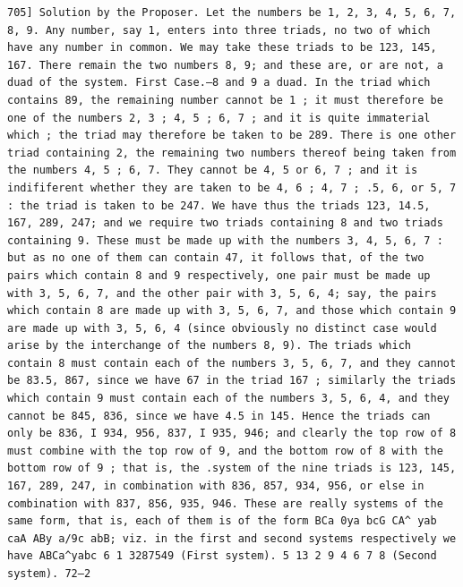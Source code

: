 \documentclass[12pt]{article}
\theoremstyle{plain}
\begin{document}
\newpage
\setcounter{page}{571}
\begin{verbatim}
705] Solution by the Proposer. Let the numbers be 1, 2, 3, 4, 5, 6, 7, 8, 9. Any number, say 1, enters into three triads, no two of which have any number in common. We may take these triads to be 123, 145, 167. There remain the two numbers 8, 9; and these are, or are not, a duad of the system. First Case.—8 and 9 a duad. In the triad which contains 89, the remaining number cannot be 1 ; it must therefore be one of the numbers 2, 3 ; 4, 5 ; 6, 7 ; and it is quite immaterial which ; the triad may therefore be taken to be 289. There is one other triad containing 2, the remaining two numbers thereof being taken from the numbers 4, 5 ; 6, 7. They cannot be 4, 5 or 6, 7 ; and it is indififerent whether they are taken to be 4, 6 ; 4, 7 ; .5, 6, or 5, 7 : the triad is taken to be 247. We have thus the triads 123, 14.5, 167, 289, 247; and we require two triads containing 8 and two triads containing 9. These must be made up with the numbers 3, 4, 5, 6, 7 : but as no one of them can contain 47, it follows that, of the two pairs which contain 8 and 9 respectively, one pair must be made up with 3, 5, 6, 7, and the other pair with 3, 5, 6, 4; say, the pairs which contain 8 are made up with 3, 5, 6, 7, and those which contain 9 are made up with 3, 5, 6, 4 (since obviously no distinct case would arise by the interchange of the numbers 8, 9). The triads which contain 8 must contain each of the numbers 3, 5, 6, 7, and they cannot be 83.5, 867, since we have 67 in the triad 167 ; similarly the triads which contain 9 must contain each of the numbers 3, 5, 6, 4, and they cannot be 845, 836, since we have 4.5 in 145. Hence the triads can only be 836, I 934, 956, 837, I 935, 946; and clearly the top row of 8 must combine with the top row of 9, and the bottom row of 8 with the bottom row of 9 ; that is, the .system of the nine triads is 123, 145, 167, 289, 247, in combination with 836, 857, 934, 956, or else in combination with 837, 856, 935, 946. These are really systems of the same form, that is, each of them is of the form BCa 0ya bcG CA^ yab caA ABy a/9c abB; viz. in the first and second systems respectively we have ABCa^yabc 6 1 3287549 (First system). 5 13 2 9 4 6 7 8 (Second system). 72—2 
\end{verbatim}
\end{document}
